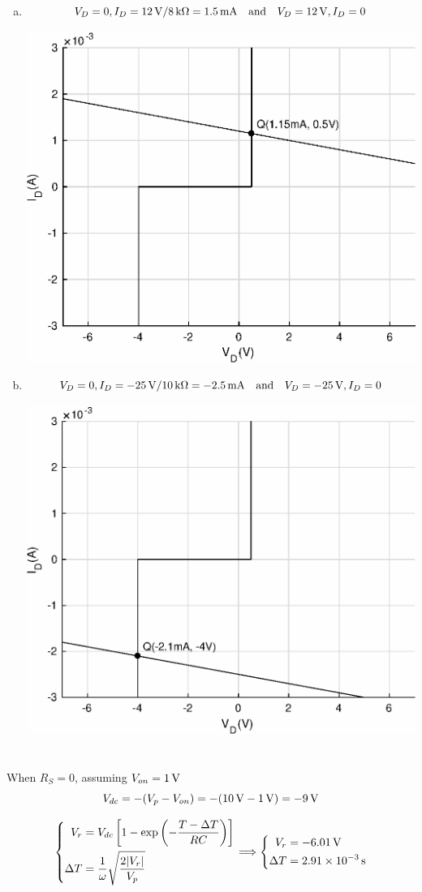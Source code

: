 \documentclass{article}
\newcommand{\unit}[1]{{\rm\,#1}}
\begin{document}
\begin{enumerate}[(a)]
\begin{center}
\end{center}
\item
$$V_D=0,I_D=12\unit{V}/8\unit{k\Omega}=1.5\unit{mA}{\rm\quad and\quad}V_D=12\unit{V},I_D=0$$
\begin{center}
\includegraphics[width=0.5\linewidth]{matlab/iv-7.eps}
\end{center}
\item
$$V_D=0,I_D=-25\unit{V}/10\unit{k\Omega}=-2.5\unit{mA}{\rm\quad and\quad}V_D=-25\unit{V},I_D=0$$
\begin{center}
\includegraphics[width=0.5\linewidth]{matlab/iv-8.eps}
\end{center}
\end{enumerate}

\section{}
When $R_S=0$, assuming $V_{on}=1\unit{V}$
$$V_{dc}=-(V_p-V_{on})=-(10\unit{V}-1\unit{V})=-9\unit{V}$$

$$\left\{\begin{aligned}
V_r&=V_{dc}\left[1-\exp\left(-\frac{T-\Delta T}{RC}\right)\right]\\
\Delta T&=\frac{1}{\omega}\sqrt{\frac{2|V_r|}{V_p}}
\end{aligned}\right.\Longrightarrow\left\{\begin{aligned}
V_r&=-6.01\unit{V}\\
\Delta T&=2.91\times10^{-3}\unit{s}
\end{aligned}\right.$$
\end{document}
